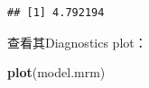 \documentclass[UTF-8]{ctexart}
\newenvironment{Shaded}{\begin{snugshade}}{\end{snugshade}}
\newcommand{\KeywordTok}[1]{\textcolor[rgb]{0.13,0.29,0.53}{\textbf{#1}}}
\newcommand{\NormalTok}[1]{#1}
\begin{document}
\begin{verbatim}
## [1] 4.792194
\end{verbatim}

查看其Diagnostics plot：
\begin{Shaded}
	\begin{Highlighting}[]
\KeywordTok{plot}\NormalTok{(model.mrm)}
	\end{Highlighting}
\end{Shaded}

\begin{figure}[H]
	\centering
	

\end{figure}
\end{document}
